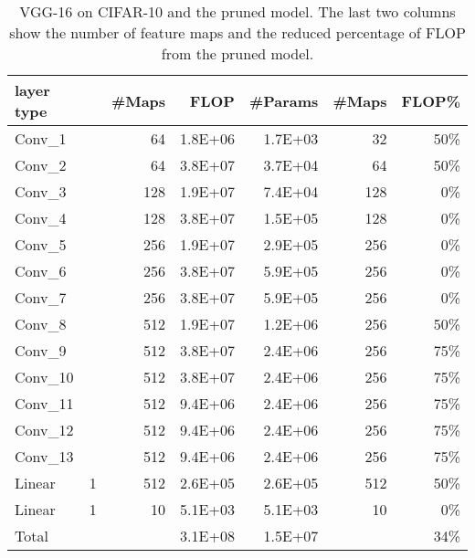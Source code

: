\documentclass{article} \usepackage{iclr2017_conference,times}
\begin{document}
\begin{table}[t]
\centering
\small
\caption{VGG-16 on CIFAR-10 and the pruned model. 
The last two columns show the number of feature maps and the reduced percentage of FLOP from the pruned model.}
\label{tab:vgg}
\begin{tabular}{l|rrrr|rr}
\toprule
layer type  &  & \#Maps     & FLOP       & \#Params  & \#Maps  & FLOP\% \\ \hline
Conv\_1     &   & 64           & 1.8E+06    & 1.7E+03   & 32      & 50\%   \\
Conv\_2     &   & 64           & 3.8E+07    & 3.7E+04   & 64      & 50\%   \\
Conv\_3     &   & 128          & 1.9E+07    & 7.4E+04   & 128     & 0\%    \\
Conv\_4     &   & 128          & 3.8E+07    & 1.5E+05   & 128     & 0\%    \\
Conv\_5     &     & 256          & 1.9E+07    & 2.9E+05   & 256     & 0\%    \\
Conv\_6     &     & 256          & 3.8E+07    & 5.9E+05   & 256     & 0\%    \\
Conv\_7     &     & 256          & 3.8E+07    & 5.9E+05   & 256     & 0\%    \\
Conv\_8     &     & 512          & 1.9E+07    & 1.2E+06   & 256     & 50\%   \\
Conv\_9     &     & 512          & 3.8E+07    & 2.4E+06   & 256     & 75\%   \\
Conv\_10    &     & 512          & 3.8E+07    & 2.4E+06   & 256     & 75\%   \\
Conv\_11    &     & 512          & 9.4E+06    & 2.4E+06   & 256     & 75\%   \\
Conv\_12    &     & 512          & 9.4E+06    & 2.4E+06   & 256     & 75\%   \\
Conv\_13    &     & 512          & 9.4E+06    & 2.4E+06   & 256     & 75\%   \\
Linear      & 1             & 512          & 2.6E+05    & 2.6E+05   & 512     & 50\%   \\
Linear      & 1             & 10           & 5.1E+03    & 5.1E+03   & 10      & 0\%    \\ \hline
Total       &               &              & 3.1E+08    & 1.5E+07   &         & 34\%   \\
\bottomrule
\end{tabular}
\vspace{-2mm}
\end{table}
\end{document}
